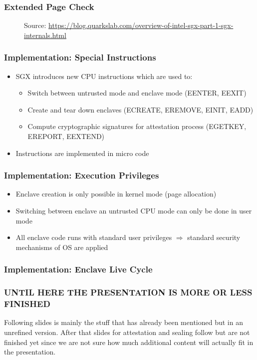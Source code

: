 \begin{frame}
    \frametitle{Extended Page Check}
    \begin{figure}
        \centering
        \caption*{Source: \url{https://blog.quarkslab.com/overview-of-intel-sgx-part-1-sgx-internals.html}}
    \end{figure}
\end{frame}

\begin{frame}
    \frametitle{Implementation: Special Instructions}
    \begin{itemize}[<+->]
        \item SGX introduces new CPU instructions which are used to:
        \begin{itemize}
            \item Switch between untrusted mode and enclave mode (EENTER, EEXIT)
            \item Create and tear down enclaves (ECREATE, EREMOVE, EINIT, EADD)
            \item Compute cryptographic signatures for attestation process (EGETKEY, EREPORT, EEXTEND)
        \end{itemize}
        \item Instructions are implemented in micro code
    \end{itemize}
\end{frame}

\begin{frame}
    \frametitle{Implementation: Execution Privileges}
    \begin{itemize}[<+->]
        \item Enclave creation is only possible in kernel mode (page allocation)
        \item Switching between enclave an untrusted CPU mode can only be done in user mode
        \item All enclave code runs with standard user privileges \newline
              $\Rightarrow$ standard security mechanisms of OS are applied    
    \end{itemize}
\end{frame}

\begin{frame}
    \frametitle{Implementation: Enclave Live Cycle}
    \centering
\end{frame}

\begin{frame}
    \frametitle{UNTIL HERE THE PRESENTATION IS MORE OR LESS FINISHED}
    Following slides is mainly the stuff that has already been mentioned but in an unrefined version.
    After that slides for attestation and sealing follow but are not finished yet since we are not sure
    how much additional content will actually fit in the presentation.

\end{frame}

